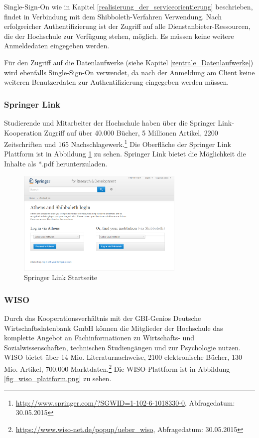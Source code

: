 Single-Sign-On wie in Kapitel \ref{realisierung_der_serviceorientierung} beschrieben, findet in Verbindung mit dem Shibboleth-Verfahren Verwendung. Nach erfolgreicher Authentifizierung ist der Zugriff auf alle Dienstanbieter-Ressourcen, die der Hochschule zur Verfügung stehen, möglich. Es müssen keine weitere Anmeldedaten eingegeben werden.

Für den Zugriff auf die Datenlaufwerke (siehe Kapitel \ref{zentrale_Datenlaufwerke}) wird ebenfalls Single-Sign-On verwendet, da nach der Anmeldung am Client keine weiteren Benutzerdaten zur Authentifizierung eingegeben werden müssen. 

\subsubsection{Springer Link}
Studierende und Mitarbeiter der Hochschule haben über die Springer Link-Kooperation Zugriff auf über 40.000 Bücher, 5 Millionen Artikel, 2200 Zeitschriften und 165 Nachschlagewerk.\footnote{\url {http://www.springer.com/?SGWID=1-102-6-1018330-0}, Abfragedatum: 30.05.2015} Die Oberfläche der Springer Link Plattform ist in Abbildung \ref{fig_springerlink_startseite} zu sehen. Springer Link bietet die Möglichkeit die Inhalte als *.pdf herunterzuladen. 

\begin{figure}[h!]
	\centering
	\includegraphics[width=8cm]{kapitel/gruppe2/bilder/springerlink_startseite}
	\caption{Springer Link Startseite \protect\footnotemark}
	\label{fig_springerlink_startseite}
\end{figure}

\subsubsection{WISO}
Durch das Kooperationsverhältnis mit der GBI-Genios Deutsche Wirtschaftsdatenbank GmbH können die Mitglieder der Hochschule das komplette Angebot an Fachinformationen zu Wirtschafts- und Sozialwissenschaften, technischen Studiengängen und zur Psychologie  nutzen. WISO bietet über 14 Mio. Literaturnachweise, 2100 elektronische Bücher, 130 Mio. Artikel, 700.000 Marktdaten.\footnote{\url{https://www.wiso-net.de/popup/ueber_wiso}, Abfragedatum: 30.05.2015} Die WISO-Plattform ist in Abbildung \ref{fig_wiso_plattform.png} zu sehen.

